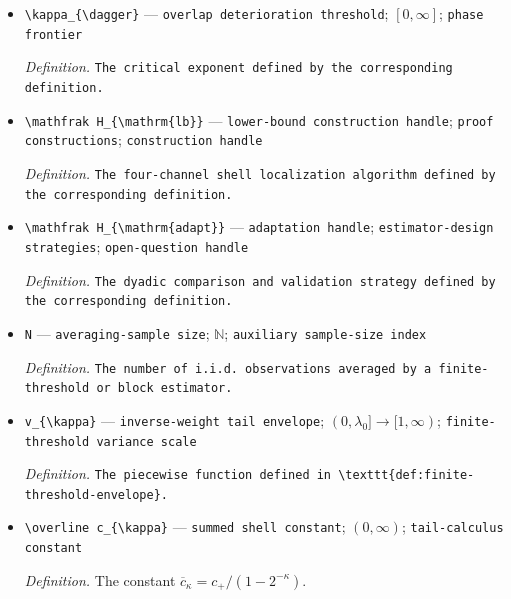 \documentclass{article}
\begin{document}
\begin{itemize}
  \item \texttt{\textbackslash{}\allowbreak{}kappa\_\allowbreak{}\{\textbackslash{}\allowbreak{}dagger\}\allowbreak{}} --- \texttt{overlap deterioration threshold}; \([0,\infty]\); \texttt{phase frontier}
  \par\smallskip\noindent\emph{Definition.} \texttt{The critical exponent defined by the corresponding definition.}
  \item \texttt{\textbackslash{}\allowbreak{}mathfrak H\_\allowbreak{}\{\textbackslash{}\allowbreak{}mathrm\{lb\}\allowbreak{}\}\allowbreak{}} --- \texttt{lower-\allowbreak{}bound construction handle}; \texttt{proof constructions}; \texttt{construction handle}
  \par\smallskip\noindent\emph{Definition.} \texttt{The four-\allowbreak{}channel shell localization algorithm defined by the corresponding definition.}
  \item \texttt{\textbackslash{}\allowbreak{}mathfrak H\_\allowbreak{}\{\textbackslash{}\allowbreak{}mathrm\{adapt\}\allowbreak{}\}\allowbreak{}} --- \texttt{adaptation handle}; \texttt{estimator-\allowbreak{}design strategies}; \texttt{open-\allowbreak{}question handle}
  \par\smallskip\noindent\emph{Definition.} \texttt{The dyadic comparison and validation strategy defined by the corresponding definition.}
  \item \texttt{N} --- \texttt{averaging-\allowbreak{}sample size}; \(\mathbb N\); \texttt{auxiliary sample-\allowbreak{}size index}
  \par\smallskip\noindent\emph{Definition.} \texttt{The number of i.i.d. observations averaged by a finite-\allowbreak{}threshold or block estimator.}
  \item \texttt{v\_\allowbreak{}\{\textbackslash{}\allowbreak{}kappa\}\allowbreak{}} --- \texttt{inverse-\allowbreak{}weight tail envelope}; \((0,\lambda_0]\to[1,\infty)\); \texttt{finite-\allowbreak{}threshold variance scale}
  \par\smallskip\noindent\emph{Definition.} \texttt{The piecewise function defined in \textbackslash{}\allowbreak{}texttt\{def:\allowbreak{}finite-\allowbreak{}threshold-\allowbreak{}envelope\}\allowbreak{}.}
  \item \texttt{\textbackslash{}\allowbreak{}overline c\_\allowbreak{}\{\textbackslash{}\allowbreak{}kappa\}\allowbreak{}} --- \texttt{summed shell constant}; \((0,\infty)\); \texttt{tail-\allowbreak{}calculus constant}
  \par\smallskip\noindent\emph{Definition.} The constant \(\overline c_{\kappa}=c_+/(1-2^{-\kappa})\).

\end{itemize}
\end{document}
